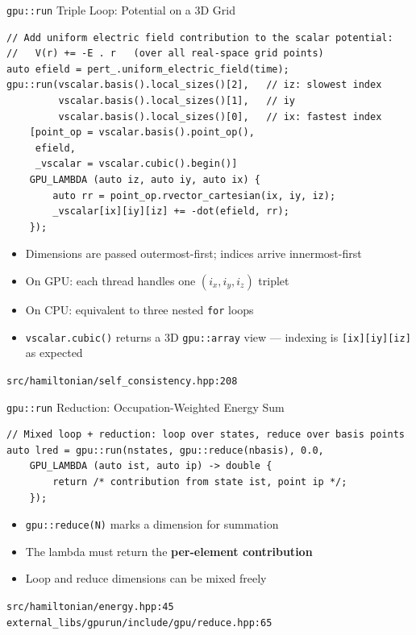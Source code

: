 \begin{frame}[fragile,label=gpurun1]{\texttt{gpu::run} Triple Loop: Potential on a 3D Grid}
\begin{lstlisting}
// Add uniform electric field contribution to the scalar potential:
//   V(r) += -E . r   (over all real-space grid points)
auto efield = pert_.uniform_electric_field(time);
gpu::run(vscalar.basis().local_sizes()[2],   // iz: slowest index
         vscalar.basis().local_sizes()[1],   // iy
         vscalar.basis().local_sizes()[0],   // ix: fastest index
    [point_op = vscalar.basis().point_op(),
     efield,
     _vscalar = vscalar.cubic().begin()]
    GPU_LAMBDA (auto iz, auto iy, auto ix) {
        auto rr = point_op.rvector_cartesian(ix, iy, iz);
        _vscalar[ix][iy][iz] += -dot(efield, rr);
    });
\end{lstlisting}
\begin{itemize}
  \item Dimensions are passed outermost-first; indices arrive innermost-first
  \item On GPU: each thread handles one $(i_x, i_y, i_z)$ triplet
  \item On CPU: equivalent to three nested \texttt{for} loops
  \item \texttt{vscalar.cubic()} returns a 3D \texttt{gpu::array} view ---
        indexing is \texttt{[ix][iy][iz]} as expected
\end{itemize}
\tiny\texttt{src/hamiltonian/self\_consistency.hpp:208}
\end{frame}

\begin{frame}[fragile,label=gpurun2]{\texttt{gpu::run} Reduction: Occupation-Weighted Energy Sum}
\begin{lstlisting}
// Mixed loop + reduction: loop over states, reduce over basis points
auto lred = gpu::run(nstates, gpu::reduce(nbasis), 0.0,
    GPU_LAMBDA (auto ist, auto ip) -> double {
        return /* contribution from state ist, point ip */;
    });
\end{lstlisting}
\begin{itemize}
  \item \texttt{gpu::reduce(N)} marks a dimension for summation
  \item The lambda must return the \textbf{per-element contribution}
  \item Loop and reduce dimensions can be mixed freely
\end{itemize}
\tiny\texttt{src/hamiltonian/energy.hpp:45} \quad
\texttt{external\_libs/gpurun/include/gpu/reduce.hpp:65}
\end{frame}

